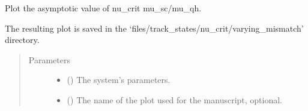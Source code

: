 \documentclass[letterpaper,10pt,english]{sphinxmanual}
\begin{document}
\begin{fulllineitems}
\label{\detokenize{modules:modules.utils.plot_micro_nu_crit_limit_vs_mismatch}}
\pysigstartsignatures
{}
\pysigstopsignatures
\sphinxAtStartPar
Plot the asymptotic value of nu\_crit  mu\_sc/mu\_qh.

\sphinxAtStartPar
The resulting plot is saved in the ‘files/track\_states/nu\_crit/varying\_mismatch’ directory.
\begin{quote}\begin{description}
\item[{Parameters}] \leavevmode\begin{itemize}
\item {} 
\sphinxAtStartPar
{} () \textendash{} The system’s parameters.

\item {} 
\sphinxAtStartPar
{} () \textendash{} The name of the plot used for the manuscript, optional.

\end{itemize}

\end{description}\end{quote}

\end{fulllineitems}

\end{document}
